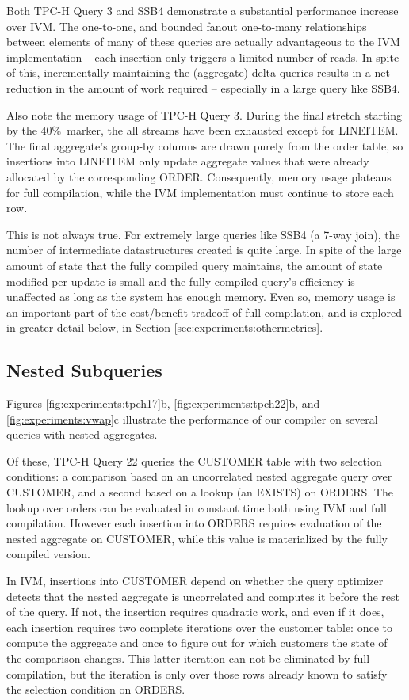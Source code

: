 Both TPC-H Query 3 and SSB4 demonstrate a substantial performance increase over IVM.  The one-to-one, and bounded fanout one-to-many relationships between elements of many of these queries are actually advantageous to the IVM implementation -- each insertion only triggers a limited number of reads.  In spite of this, incrementally maintaining the (aggregate) delta queries results in a net reduction in the amount of work required -- especially in a large query like SSB4.

Also note the memory usage of TPC-H Query 3.  During the final stretch starting by the 40\%\ marker, the all streams have been exhausted except for LINEITEM.  The final aggregate's group-by columns are drawn purely from the order table, so insertions into LINEITEM only update aggregate values that were already  allocated by the corresponding ORDER.  Consequently, memory usage plateaus for full compilation, while the IVM implementation must continue to store each row.

This is not always true.  For extremely large queries like SSB4 (a 7-way join), the number of intermediate datastructures created is quite large.  In spite of the large amount of state that the fully compiled query maintains, the amount of state modified per update is small and the fully compiled query's efficiency is unaffected as long as the system has enough memory.  Even so, memory usage is an important part of the cost/benefit tradeoff of full compilation, and is explored in greater detail below, in Section \ref{sec:experiments:othermetrics}.

\subsection{Nested Subqueries}

Figures \ref{fig:experiments:tpch17}b, \ref{fig:experiments:tpch22}b, and \ref{fig:experiments:vwap}c illustrate the performance of our compiler on several queries with nested aggregates.

Of these, TPC-H Query 22 queries the CUSTOMER table with two selection conditions: a comparison based on an uncorrelated nested aggregate query over CUSTOMER, and a second based on a lookup (an EXISTS) on ORDERS.  The lookup over orders can be evaluated in constant time both using IVM and full compilation.  However each insertion into ORDERS requires evaluation of the nested aggregate on CUSTOMER, while this value is materialized by the fully compiled version.  

In IVM, insertions into CUSTOMER depend on whether the query optimizer detects that the nested aggregate is uncorrelated and computes it before the rest of the query.  If not, the insertion requires quadratic work, and even if it does, each insertion requires two complete iterations over the customer table: once to compute the aggregate and once to figure out for which customers the state of the comparison changes.  This latter iteration can not be eliminated by full compilation, but the iteration is only over those rows already known to satisfy the selection condition on ORDERS.

